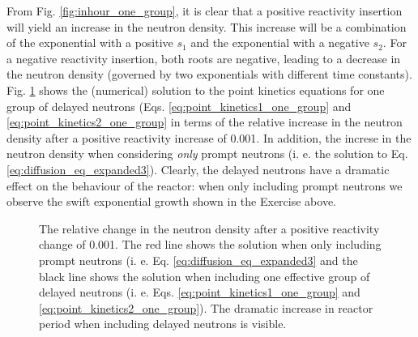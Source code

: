 From Fig. \ref{fig:inhour_one_group}, it is clear that a positive reactivity insertion will yield an increase in the neutron density. This increase will be a combination of the exponential with a positive $s_1$ and the exponential with a negative $s_2$. For a negative reactivity insertion, both roots are negative, leading to a decrease in the neutron density (governed by two exponentials with different time constants). Fig. \ref{fig:prompt_delayed_diff} shows the (numerical) solution to the point kinetics equations for one group of delayed neutrons (Eqs. \ref{eq:point_kinetics1_one_group} and \ref{eq:point_kinetics2_one_group} in terms of the relative increase in the neutron density after a positive reactivity increase of 0.001. In addition, the increse in the neutron density when considering \emph{only} prompt neutrons (i. e. the solution to Eq. \ref{eq:diffusion_eq_expanded3}). Clearly, the delayed neutrons have a dramatic effect on the behaviour of the reactor: when only including prompt neutrons we observe the swift exponential growth shown in the Exercise above.
\begin{figure}[ht!]
\protect {}\protect
\caption{\label{fig:prompt_delayed_diff} \footnotesize{The relative change in the neutron density after a positive reactivity change of 0.001. The red line shows the solution when only including prompt neutrons (i. e. Eq. \ref{eq:diffusion_eq_expanded3} and the black line shows the solution when including one effective group of delayed neutrons (i. e. Eqs. \ref{eq:point_kinetics1_one_group} and \ref{eq:point_kinetics2_one_group}). The dramatic increase in reactor period when including delayed neutrons is visible.}}
\end{figure}

